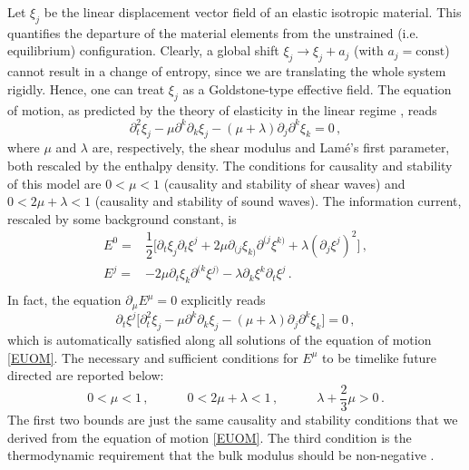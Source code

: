 \documentclass[a4paper, amsfonts, amssymb, amsmath, reprint, showkeys, nofootinbib, twoside,notitlepage,onecolumn,preprintnumbers]{revtex4-2}
\newcommand{\spc}{\quad \quad \quad}
\theoremstyle{definition}
\theoremstyle{theorem}
\theoremstyle{corollary}
\begin{document}
Let $\xi_j$ be the linear displacement vector field of an elastic isotropic material. This quantifies the departure of the material elements from the unstrained (i.e. equilibrium) configuration. Clearly, a global shift $\xi_j \rightarrow \xi_j +a_j$ (with $a_j=\text{const}$) cannot result in a change of entropy, since we are translating the whole system rigidly. Hence, one can treat $\xi_j$ as a Goldstone-type effective field. The equation of motion, as predicted by the theory of elasticity in the linear regime \cite{landau7}, reads
\begin{equation}\label{EUOM}
\partial^2_t \xi_j - \mu \partial^k \partial_k \xi_j- (\mu {+}\lambda)\partial_j \partial^k \xi_k =0 \, ,
\end{equation}
where $\mu$ and $\lambda$ are, respectively, the shear modulus and Lam\'e{}'s first parameter, both rescaled by the enthalpy density. The conditions for causality and stability of this model are $0 < \mu <1$ (causality and stability of shear waves) and $0<2\mu {+}\lambda<1$ (causality and stability of sound waves). The information current, rescaled by some background constant, is 
\begin{equation}
\begin{split}
E^0 ={}& \dfrac{1}{2} \big[\partial_t \xi_j \partial_t \xi^j +2\mu \partial_{(j}\xi_{k)}\partial^{(j}\xi^{k)}+\lambda (\partial_j \xi^j)^2 \big] \, ,\\
E^j ={}& -2\mu \partial_t \xi_k  \partial^{(k} \xi^{j)}-\lambda \partial_k \xi^k \partial_t \xi^j \, . \\
\end{split}
\end{equation}
In fact, the equation $\partial_\mu E^\mu=0$ explicitly reads
\begin{equation}
\partial_t \xi^j \big[ \partial^2_t \xi_j -\mu \partial^k \partial_k \xi_j -(\mu{+}\lambda)\partial_j \partial^k \xi_k \big]=0 \, ,
\end{equation}
which is automatically satisfied along all solutions of the equation of motion \eqref{EUOM}. The necessary and sufficient conditions for $E^\mu$ to be timelike future directed are reported below:
\begin{equation}
  0 < \mu <1 \, , \spc  0<2\mu {+}\lambda<1 \, , \spc \lambda+\dfrac{2}{3} \mu >0 \, . 
\end{equation}
The first two bounds are just the same causality and stability conditions that we derived from the equation of motion \eqref{EUOM}. The third condition is the thermodynamic requirement that the bulk modulus should be non-negative \cite{landau7}. 
\end{document}
